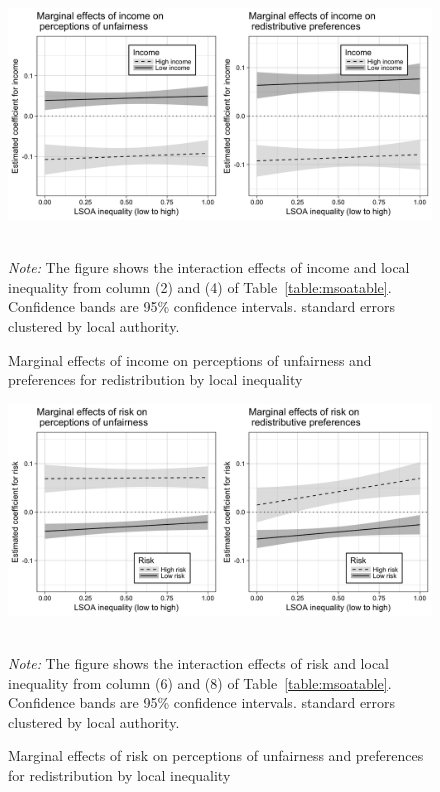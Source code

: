 \documentclass[12pt, letter]{scrartcl}
\begin{document}
\begin{figure}[t]
\caption{Marginal effects of income on perceptions of unfairness and preferences for redistribution by local inequality}
\centering
\vspace{10pt}
\includegraphics[scale=0.16]{b5to6.png}
\label{fig:56}
{\footnotesize \\ \textit{Note:} The figure shows the interaction effects of income and local inequality from column (2) and (4) of Table~\ref{table:msoatable}. Confidence bands are 95\% confidence intervals. standard errors clustered by local authority. \par}
\end{figure}

\begin{figure}[h]
\caption{Marginal effects of risk on perceptions of unfairness and preferences for redistribution by local inequality}
\centering
\vspace{10pt}
\includegraphics[scale=0.16]{b7to8.png}
\label{fig:78}
{\footnotesize \\ \textit{Note:} The figure shows the interaction effects of risk and local inequality from column (6) and (8) of Table~\ref{table:msoatable}. Confidence bands are 95\% confidence intervals. standard errors clustered by local authority.\par}
\end{figure}
\end{document}
